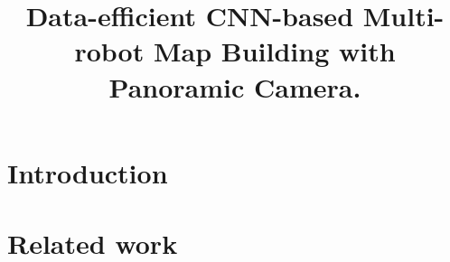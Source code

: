 \documentclass[letterpaper, 10 pt, conference]{ieeeconf}  %
\title{\LARGE \bf
Data-efficient CNN-based Multi-robot Map Building with Panoramic Camera.
}
\begin{document}
\maketitle
\thispagestyle{empty}
\pagestyle{empty}


\begin{abstract}

\end{abstract}

\section{Introduction}


\section{Related work}




\end{document}
